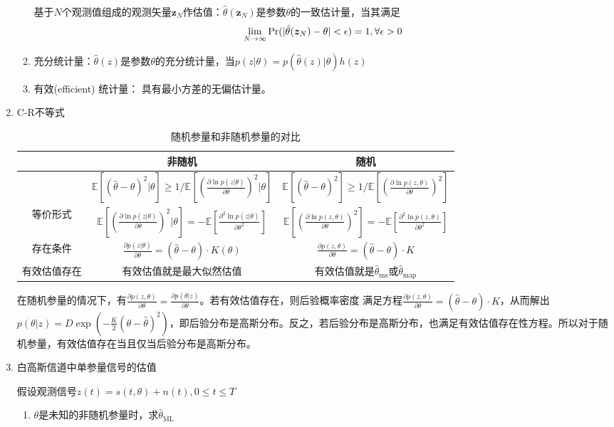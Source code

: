 \documentclass{article}
\def\E{\mathbb{E}}
\DeclarePairedDelimiter\abs{\lvert}{\rvert}
\begin{document}
\begin{enumerate}
\begin{enumerate}[label=(\alph*)]
基于$N$个观测值组成的观测矢量$\bm{z}_N$作估值：$\hat{\theta}(\bm{z}_N)$是参数$\theta$的一致估计量，当其满足
$$
\lim_{N\to \infty} \Pr(\abs{\hat{\theta}(\bm{z}_N)-\theta}<\epsilon)=1,\forall \epsilon>0
$$
\item 充分统计量：$\hat{\theta}(z)$是参数$\theta$的充分统计量，当$p(z|\theta)=p(\hat{\theta}(z)|\theta)h(z)$
\item 有效(efficient) 统计量：
具有最小方差的无偏估计量。
\end{enumerate}
\item C-R不等式
\begin{table}[!ht]
\begin{tabular}{ccc}
\hline
&非随机 & 随机 \\
\hline
&$\E[(\hat{\theta}-\theta)^2|\theta]\geq 1/\E\left[\left(\frac{\partial \ln p(z|\theta)}{\partial \theta}\right)^2|\theta\right]$ & $\E[(\hat{\theta}-\theta)^2]\geq 1/\E\left[\left(\frac{\partial \ln p(z,\theta)}{\partial \theta}\right)^2\right]$ \\
等价形式&$\E\left[\left(\frac{\partial \ln p(z|\theta)}{\partial \theta}\right)^2|\theta\right]=-\E\left[\frac{\partial^2 \ln p(z|\theta)}{\partial \theta^2}\right]$ & $\E\left[\left(\frac{\partial \ln p(z,\theta)}{\partial \theta}\right)^2 \right]=-\E\left[\frac{\partial^2 \ln p(z,\theta)}{\partial \theta^2}\right]$ \\
存在条件& $\frac{\partial p(z|\theta)}{\partial \theta} = (\hat{\theta}-\theta)\cdot K(\theta)$ & $\frac{\partial p(z,\theta)}{\partial \theta} = (\hat{\theta}-\theta)\cdot K$ \\
有效估值存在 & 有效估值就是最大似然估值 & 有效估值就是$\hat{\theta}_{\mathrm{ms}}$或$\hat{\theta}_{\mathrm{map}}$ \\
\hline
\end{tabular}
\caption{随机参量和非随机参量的对比}
\end{table}

在随机参量的情况下，有$\frac{\partial p(z,\theta)}{\partial \theta} = \frac{\partial p(\theta|z)}{\partial \theta}$。若有效估值存在，则后验概率密度
满足方程$\frac{\partial p(z,\theta)}{\partial \theta} = (\hat{\theta}-\theta)\cdot K$，从而解出$p(\theta|z)=D\exp\left(-\frac{K}{2}(\theta-\hat{\theta})^2\right)$，即后验分布是高斯分布。反之，若后验分布是高斯分布，也满足有效估值存在性方程。所以对于随机参量，有效估值存在当且仅当后验分布是高斯分布。
\item 白高斯信道中单参量信号的估值

假设观测信号$z(t)=s(t,\theta)+n(t),0\leq t\leq T$
\begin{enumerate}[label=(\arabic*)]
\item $\theta$是未知的非随机参量时，求$\hat{\theta}_{\mathrm{ML}}$


\end{enumerate}
\end{enumerate}
\end{document}
